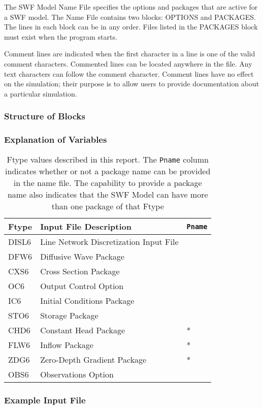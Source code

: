The SWF Model Name File specifies the options and packages that are active for a SWF model.  The Name File contains two blocks: OPTIONS  and PACKAGES. The lines in each block can be in any order.  Files listed in the PACKAGES block must exist when the program starts. 

Comment lines are indicated when the first character in a line is one of the valid comment characters.  Commented lines can be located anywhere in the file. Any text characters can follow the comment character. Comment lines have no effect on the simulation; their purpose is to allow users to provide documentation about a particular simulation. 

\vspace{5mm}
\subsubsection{Structure of Blocks}



\vspace{5mm}
\subsubsection{Explanation of Variables}
\begin{description}

\end{description}

\begin{table}[H]
\caption{Ftype values described in this report.  The \texttt{Pname} column indicates whether or not a package name can be provided in the name file.  The capability to provide a package name also indicates that the SWF Model can have more than one package of that Ftype}
\small
\begin{center}
\begin{tabular*}{\columnwidth}{l l l}
\hline
\hline
Ftype & Input File Description & \texttt{Pname}\\
\hline
DISL6 & Line Network Discretization Input File \\
DFW6 & Diffusive Wave Package \\ 
CXS6 & Cross Section Package \\ 
OC6 & Output Control Option \\
IC6 & Initial Conditions Package \\
STO6 & Storage Package \\
CHD6 & Constant Head Package & * \\ 
FLW6 & Inflow Package & * \\ 
ZDG6 & Zero-Depth Gradient Package & * \\ 
OBS6 & Observations Option \\
\hline 
\end{tabular*}
\label{table:ftype}
\end{center}
\normalsize
\end{table}

\vspace{5mm}
\subsubsection{Example Input File}



